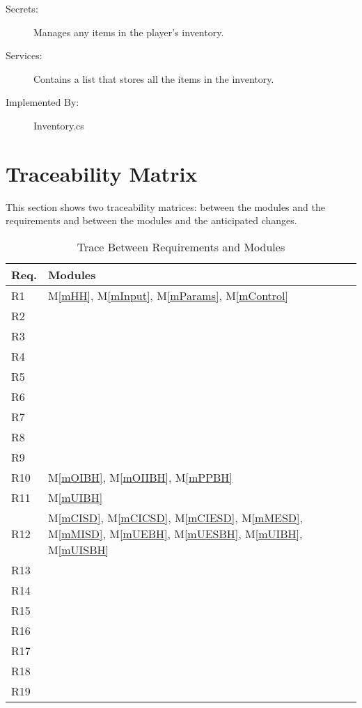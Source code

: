 \documentclass[12pt, titlepage]{article}
\newcommand{\mref}[1]{M\ref{#1}}
\begin{document}
\begin{description}
\item[Secrets:] Manages any items in the player's inventory.
\item[Services:] Contains a list that stores all the items in the inventory.
\item[Implemented By:] Inventory.cs
\end{description}

\section{Traceability Matrix} \label{SecTM}

This section shows two traceability matrices: between the modules and the
requirements and between the modules and the anticipated changes.

\begin{table}[H]
\centering
\begin{tabular}{p{} p{}}
\toprule
\textbf{Req.} & \textbf{Modules}\\
\midrule
R1 & \mref{mHH}, \mref{mInput}, \mref{mParams}, \mref{mControl}\\
R2 &  \\
R3 &  \\
R4 &  \\
R5 &  \\
R6 &  \\
R7 &  \\
R8 &  \\
R9 &  \\
R10 & \mref{mOIBH}, \mref{mOIIBH},  \mref{mPPBH}  \\
R11 & \mref{mUIBH} \\
R12 & \mref{mCISD}, \mref{mCICSD}, \mref{mCIESD}, \mref{mMESD}, \mref{mMISD}, \mref{mUEBH}, \mref{mUESBH}, \mref{mUIBH}, \mref{mUISBH}\\
R13 &  \\
R14 &  \\
R15 &  \\
R16 &  \\
R17 &  \\
R18 &  \\
R19 &  \\
\bottomrule
\end{tabular}
\caption{Trace Between Requirements and Modules}
\label{TblRT}
\end{table}
\end{document}
